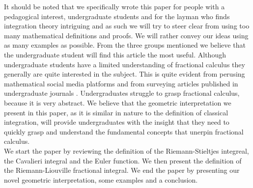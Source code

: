 \documentclass{article}
\theoremstyle{theorem}
\theoremstyle{definition}
\begin{document}
\noindent
It should be noted that we specifically wrote this paper for people with a pedagogical interest, undergraduate students and for the layman who finds integration theory intriguing and 
as such we will try to steer clear from using too many mathematical definitions and proofs. We will rather convey our ideas using as many examples as possible. From the 
three groups mentioned we believe that the undergraduate student will find this article the most useful. Although undergraduate students have a limited understanding of 
fractional calculus they generally are quite interested in the subject. This is quite evident from perusing mathematical social media platforms and from surveying 
articles published in undergraduate journals \cite{munkhammar05}. Undergraduates struggle to grasp fractional calculus, because it is very abstract. We believe that the geometric interpretation we present in this paper, as it is similar in nature to the definition of classical integration, will provide undergraduates with the insight that they need to quickly grasp and understand the fundamental 
concepts that unerpin fractional calculus.\\


\noindent
We start the paper by reviewing the definition of the Riemann-Stieltjes integreal, the Cavalieri integral and the Euler function. We then present the definition of the Riemann-Liouville fractional integral. 
We end the paper by presenting our novel geometric interpretation, some examples and a conclusion.

\end{document}
